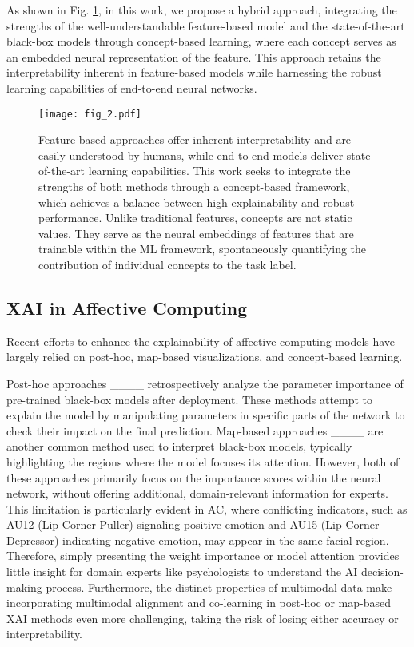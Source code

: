     As shown in Fig. \ref{fig_ven}, in this work, we propose a hybrid approach, integrating the strengths of the well-understandable feature-based model and the state-of-the-art black-box models through concept-based learning, where each concept serves as an embedded neural representation of the feature. This approach retains the interpretability inherent in feature-based models while harnessing the robust learning capabilities of end-to-end neural networks. 

    \begin{figure}[t]
    \centering
    \texttt{[image: fig\_2.pdf]}
       \caption{Feature-based approaches offer inherent interpretability and are easily understood by humans, while end-to-end models deliver state-of-the-art learning capabilities. This work seeks to integrate the strengths of both methods through a concept-based framework, which achieves a balance between high explainability and robust performance. Unlike traditional features, concepts are not static values. They serve as the neural embeddings of features that are trainable within the ML framework, spontaneously quantifying the contribution of individual concepts to the task label. }
    \label{fig_ven}
    \end{figure}
    

\subsection{XAI in Affective Computing} \label{xai_in_ac}
    Recent efforts to enhance the explainability of affective computing models have largely relied on post-hoc, map-based visualizations, and concept-based learning.

    Post-hoc approaches ____ retrospectively analyze the parameter importance of pre-trained black-box models after deployment. These methods attempt to explain the model by manipulating parameters in specific parts of the network to check their impact on the final prediction. Map-based approaches ____ are another common method used to interpret black-box models, typically highlighting the regions where the model focuses its attention. However, both of these approaches primarily focus on the importance scores within the neural network, without offering additional, domain-relevant information for experts. This limitation is particularly evident in AC, where conflicting indicators, such as AU12 (Lip Corner Puller) signaling positive emotion and AU15 (Lip Corner Depressor) indicating negative emotion, may appear in the same facial region. Therefore, simply presenting the weight importance or model attention provides little insight for domain experts like psychologists to understand the AI decision-making process. Furthermore, the distinct properties of multimodal data make incorporating multimodal alignment and co-learning in post-hoc or map-based XAI methods even more challenging, taking the risk of losing either accuracy or interpretability.

